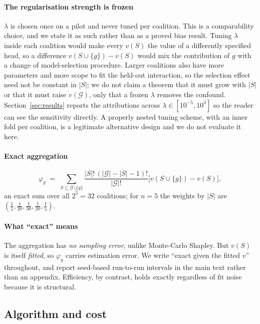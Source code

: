 \documentclass[pdflatex,sn-basic,Numbered]{sn-jnl}
\theoremstyle{plain}
\theoremstyle{definition}
\newcommand{\G}{\mathcal{G}}
\begin{document}
\paragraph{The regularisation strength is frozen}
$\lambda$ is chosen once on a pilot and never tuned per coalition. This is a
comparability choice, and we state it as such rather than as a proved bias
result. Tuning $\lambda$ inside each coalition would make every $v(S)$ the
value of a differently specified head, so a difference $v(S \cup \{g\}) - v(S)$
would mix the contribution of $g$ with a change of model-selection procedure.
Larger coalitions also have more parameters and more scope to fit the held-out
interaction, so the selection effect need not be constant in $|S|$; we do not
claim a theorem that it must grow with $|S|$ or that it must raise $v(\G)$,
only that a frozen $\lambda$ removes the confound. Section~\ref{sec:results}
reports the attributions across $\lambda \in [10^{-5}, 10^{3}]$ so the reader
can see the sensitivity directly. A properly nested tuning scheme, with an
inner fold per coalition, is a legitimate alternative design and we do not
evaluate it here.

\paragraph{Exact aggregation}

\begin{equation}
\varphi_g \;=\; \sum_{S \subseteq \G \setminus \{g\}}
\frac{|S|!\,(|\G| - |S| - 1)!}{|\G|!}
\bigl[ v(S \cup \{g\}) - v(S) \bigr],
\label{eq:shapley}
\end{equation}
an exact sum over all $2^5 = 32$ coalitions; for $n=5$ the weights by $|S|$
are $(\tfrac15, \tfrac1{20}, \tfrac1{30}, \tfrac1{20}, \tfrac15)$.

\paragraph{What ``exact'' means}
The aggregation has \emph{no sampling error}, unlike Monte-Carlo Shapley. But
$v(S)$ is itself \emph{fitted}, so $\varphi_g$ carries estimation error. We
write ``exact given the fitted $v$'' throughout, and report seed-based
run-to-run intervals in the main text rather than an appendix. Efficiency, by
contrast, holds exactly regardless of fit noise because it is structural.

\subsection{Algorithm and cost}\label{sec:algorithm}
\end{document}
